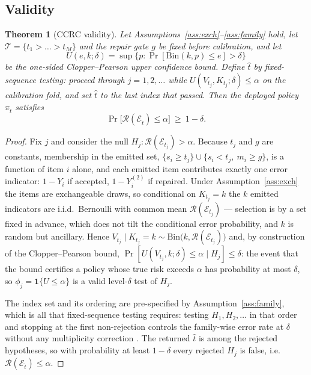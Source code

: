 \documentclass{article}
\theoremstyle{plain}
\newtheorem{theorem}{Theorem}
\theoremstyle{definition}
\theoremstyle{remark}
\newcommand{\Risk}{\mathcal{R}}
\newcommand{\emit}{\mathcal{E}}
\begin{document}
\subsection{Validity}
\label{sec:validity}

\begin{theorem}[CCRC validity]
\label{thm:validity}
Let Assumptions~\ref{ass:exch}--\ref{ass:family} hold, let $\mathcal{T}=\{t_1>\dots>t_M\}$
and the repair gate $g$ be fixed before calibration, and let
\[
U(e,k;\delta)=\sup\{p:\Pr[\mathrm{Bin}(k,p)\le e]>\delta\}
\]
be the one-sided Clopper--Pearson upper confidence bound. Define
$\hat t$ by fixed-sequence testing: proceed through $j=1,2,\dots$ while
$U(V_{t_j},K_{t_j};\delta)\le\alpha$ on the calibration fold, and set
$\hat t$ to the last index that passed. Then the deployed policy
$\pi_{\hat t}$ satisfies
\[
\Pr\bigl[\Risk(\emit_{\hat t})\le\alpha\bigr]\ \ge\ 1-\delta .
\]
\end{theorem}

\begin{proof}
Fix $j$ and consider the null $H_j:\Risk(\emit_{t_j})>\alpha$. Because $t_j$ and $g$ are
constants, membership in the emitted set,
$\{s_i\ge t_j\}\cup\{s_i<t_j,\ m_i\ge g\}$, is a function of item $i$ alone, and each emitted
item contributes exactly one error indicator: $1-Y_i$ if accepted, $1-Y^{(2)}_i$ if repaired.
Under Assumption~\ref{ass:exch} the items are exchangeable draws, so conditional on
$K_{t_j}=k$ the $k$ emitted indicators are i.i.d.\ Bernoulli with common mean
$\Risk(\emit_{t_j})$ --- selection is by a set fixed in advance, which does not tilt the
conditional error probability, and $k$ is random but ancillary. Hence
$V_{t_j}\mid K_{t_j}=k\sim\mathrm{Bin}\bigl(k,\Risk(\emit_{t_j})\bigr)$ and, by construction of
the Clopper--Pearson bound, $\Pr[U(V_{t_j},k;\delta)\le\alpha\mid H_j]\le\delta$: the event
that the bound certifies a policy whose true risk exceeds $\alpha$ has probability at most
$\delta$, so $\phi_j=\mathbf{1}\{U\le\alpha\}$ is a valid level-$\delta$ test of $H_j$.

The index set and its ordering are pre-specified by Assumption~\ref{ass:family}, which is all
that fixed-sequence testing requires: testing $H_1,H_2,\dots$ in that order and stopping at
the first non-rejection controls the family-wise error rate at $\delta$ without any
multiplicity correction \citep{angelopoulos2021ltt}. The returned $\hat t$ is among the
rejected hypotheses, so with probability at least $1-\delta$ every rejected $H_j$ is false,
i.e.\ $\Risk(\emit_{\hat t})\le\alpha$.
\end{proof}
\end{document}
